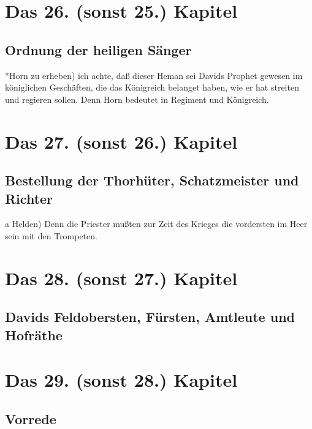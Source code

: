 \chapter{Das 26. (sonst 25.) Kapitel}

\section[Ordnung der heiligen Sänger]{Ordnung der heiligen Sänger}

*Horn zu erheben) ich achte, daß dieser Heman sei Davids Prophet gewesen im königlichen Geschäften, die das Königreich belanget haben, wie er hat streiten und regieren sollen. Denn Horn bedeutet in Regiment und Königreich.

\chapter{Das 27. (sonst 26.) Kapitel}

\section[Bestellung der Thorhüter, Schatzmeister und Richter]{Bestellung der Thorhüter, Schatzmeister und Richter}

a Helden) Denn die Priester mußten zur Zeit des Krieges die vordersten im Heer sein mit den Trompeten.

\chapter{Das 28. (sonst 27.) Kapitel}

\section[Davids Feldobersten, Fürsten, Amtleute und Hofräthe]{Davids Feldobersten, Fürsten, Amtleute und Hofräthe}

\chapter{Das 29. (sonst 28.) Kapitel}

\section{Vorrede}

